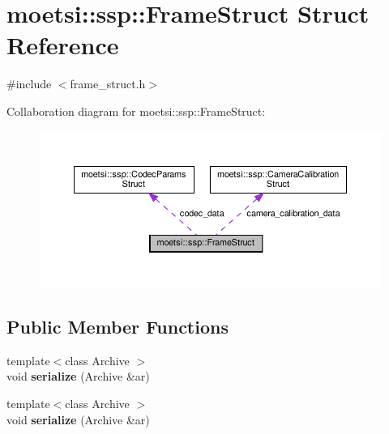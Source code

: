 \hypertarget{structmoetsi_1_1ssp_1_1FrameStruct}{}\section{moetsi\+:\+:ssp\+:\+:Frame\+Struct Struct Reference}
\label{structmoetsi_1_1ssp_1_1FrameStruct}


{\ttfamily \#include $<$frame\+\_\+struct.\+h$>$}



Collaboration diagram for moetsi\+:\+:ssp\+:\+:Frame\+Struct\+:
\nopagebreak
\begin{figure}[H]
\begin{center}
\leavevmode
\includegraphics[width=350pt]{structmoetsi_1_1ssp_1_1FrameStruct__coll__graph}
\end{center}
\end{figure}
\subsection*{Public Member Functions}
\begin{DoxyCompactItemize}
\item 
\mbox{\label{structmoetsi_1_1ssp_1_1FrameStruct_af53f4e76978e2a4575b7cd661d30e01f}} 
{\footnotesize template$<$class Archive $>$ }\\void {\bfseries serialize} (Archive \&ar)
\item 
\mbox{\label{structmoetsi_1_1ssp_1_1FrameStruct_af53f4e76978e2a4575b7cd661d30e01f}} 
{\footnotesize template$<$class Archive $>$ }\\void {\bfseries serialize} (Archive \&ar)
\end{DoxyCompactItemize}
